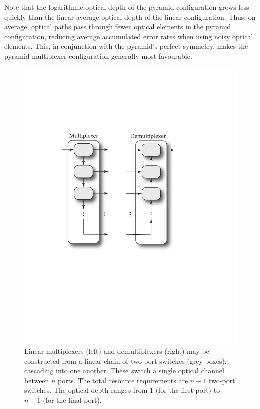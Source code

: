 \documentclass[aps, rmp, twocolumn, amsmath, amssymb, nofootinbib, superscriptaddress, longbibliography, floatfix, table-of-contents, eqsecnum]{revtex4-1}
\begin{document}
Note that the logarithmic optical depth of the pyramid configuration grows less quickly than the linear average optical depth of the linear configuration. Thus, on average, optical paths pass through fewer optical elements in the pyramid configuration, reducing average accumulated error rates when using noisy optical elements. This, in conjunction with the pyramid's perfect symmetry, makes the pyramid multiplexer configuration generally most favourable.

\begin{figure}[!htb]
\includegraphics[width=0.85\columnwidth]{linear_multiplexer}
\caption{Linear multiplexers (left) and demultiplexers (right) may be constructed from a linear chain of two-port switches (grey boxes), cascading into one another. These switch a single optical channel between $n$ ports. The total resource requirements are \mbox{$n-1$} two-port switches. The optical depth ranges from $1$ (for the first port) to \mbox{$n-1$} (for the final port).} \label{fig:linear_multiplexer} 
\end{figure}
\end{document}
